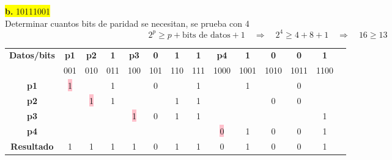 \documentclass{article}
\begin{document}
	\begin{center}
		\hspace{3cm}\colorbox{yellow}{{\textbf{b.} 10111001}}\newline
		\\Determinar cuantos bits de paridad se necesitan, se prueba con 4
		\[
		2^p \geq p + \text{bits de datos} + 1
		\quad \Rightarrow \quad	2^4 \geq 4 + 8 + 1 \quad \Rightarrow \quad 16 \geq 13
		\]
		
		\begin{table}[h!]
			\centering
			\begin{tabular}{c|ccccccccccccc}
				\toprule
				\textbf{Datos/bits} & \textbf{p1} & \textbf{p2} & \textbf{1} & \textbf{p3} & \textbf{0} & \textbf{1} & \textbf{1} & \textbf{p4} & \textbf{1} & \textbf{0} & \textbf{0} & \textbf{1} \\ & \scriptsize001 & \scriptsize010 & \scriptsize011 & \scriptsize100 & \scriptsize101 & \scriptsize110 & \scriptsize111 & \scriptsize1000 & \scriptsize1001 & \scriptsize1010 & \scriptsize1011 & \scriptsize1100 \\
				\midrule
				\textbf{p1} & \colorbox{pink}{1} & & 1 & & 0 & & 1 & & 1 & & 0 &\\
				\midrule
				\textbf{p2} &  & \colorbox{pink}{1} & 1 & & & 1 & 1 & & & 0 & 0 &  \\
				\midrule
				\textbf{p3} &  & & & \colorbox{pink}{1} & 0 & 1 & 1 & & & & & 1 \\
				\midrule
				\textbf{p4} & & & & & & & & \colorbox{pink}{0} & 1 & 0 & 0 & 1 \\
				\midrule
				\midrule
				\textbf{Resultado} & 1 & 1 & 1 & 1 & 0 & 1 & 1 & 0 & 1 & 0 & 0 & 1 \\
				\bottomrule
			\end{tabular}
		\end{table}
	\end{center}
	
	
	
	
	
\end{document}
